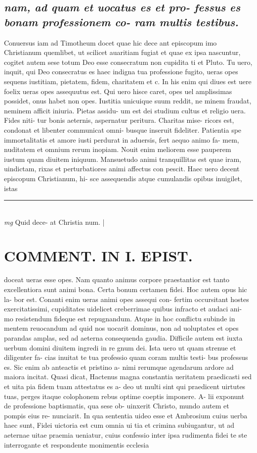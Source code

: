 \documentclass{article}
\begin{document}
\begin{pages}
\subsection*{\textit{nam, ad quam et uocatus es et pro- fessus es bonam professionem co- ram multis testibus. }}\pstart Conuersus iam ad Timotheum docet quae hic dece ant episcopum imo Christianum quemlibet, ut scilicet auaritiam fugiat et quae ex ipsa nascuntur, cogitet autem sese totum Deo esse consecratum non cupidita ti et Pluto. Tu uero, inquit, qui Deo consecratus es haec indigna tua professione fugito, ueras opes sequens iustitiam, pietatem, fidem, charitatem et c. In his enim qui diues est uere foelix ueras opes assequutus est. Qui uero hisce caret, opes uel amplissimas possidet, onus habet non opes. Iustitia unicuique suum reddit, ne minem fraudat, neminem afficit iniuria. Pietas assidu- um est dei studium cultus et religio uera. Fides niti- tur bonis aeternis, aspernatur peritura. Charitas mise- ricors est, condonat et libenter communicat omni- busque inseruit fideliter. Patientia spe immortalitatis et amore iusti perdurat in aduersis, fert aequo animo fa- mem, nuditatem et omnium rerum inopiam. Nouit enim meliorem esse pauperem iustum quam diuitem iniquum. Mansuetudo animi tranquillitas est quae iram, uindictam, rixas et perturbatiores animi affectus con pescit. Haec uero decent episcopum Christianum, hi- sce assequendis atque cumulandis opibus inuigilet, istas  \pend
\vspace{0.5cm}\noindent
\vspace{0.2cm}\rule{1cm}{0.2pt}\\ 
\hspace{0.2cm}\textit{mg}
\footnotesize Quid dece- at Christia num. 
\normalsize| 
\section*{COMMENT. IN I. EPIST. }\pstart doceat ueras esse opes. Nam quanto animus corpore praestantior est tanto excellentiora sunt animi bona. Certa bonum certamen fidei. Hoc autem opus hic la- bor est. Conanti enim ueras animi opes assequi con- fertim occursitant hostes exercitatissimi, cupiditates uidelicet creberrimae quibus infracto et audaci ani- mo resistendum fideque est repugnandum. Atque in hoc conflictu subinde in mentem reuocandum ad quid nos uocarit dominus, non ad uoluptates et opes parandas amplas, sed ad aeterna consequenda gaudia. Difficile autem est iuxta uerbum domini diuitem ingredi in re gnum dei. Ista uero ut quam strenue et diligenter fa- cias inuitat te tua professio quam coram multis testi- bus professus es. Sic enim ab anteactis et pristino a- nimi rerumque agendarum ardore ad maiora incitat. Quasi dicat, Hactenus magna constantia ueritatem praedicasti sed et uita pia fidem tuam attestatus es a- deo ut multi sint qui praedicent uirtutes tuas, perges itaque colophonem rebus optime coeptis imponere. A- lii exponunt de professione baptismatis, qua sese ob- uinxerit Christo, mundo autem et pompis eius re- nunciarit. In qua sententia uideo esse et Ambrosium cuius uerba haec sunt, Fidei uictoria est cum omnia ui tia et crimina subiugantur, ut ad aeternae uitae praemia ueniatur, cuius confessio inter ipsa rudimenta fidei te ste interrogante et respondente monimentis ecclesia  \pend

\end{pages}
\end{document}
